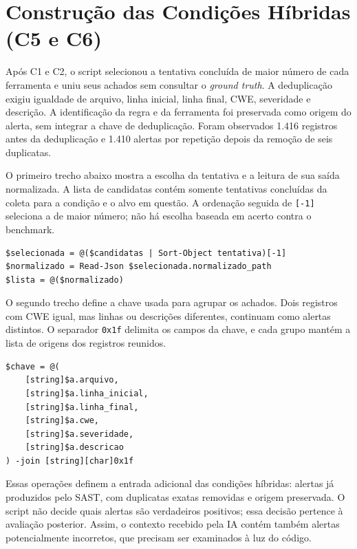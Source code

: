 \section{Construção das Condições Híbridas (C5 e C6)}\label{sec:condicao-hibrida-desenvolvimento}

Após C1 e C2, o script  selecionou a tentativa concluída de maior número de cada ferramenta e uniu seus achados sem consultar o \textit{ground truth}. A deduplicação exigiu igualdade de arquivo, linha inicial, linha final, CWE, severidade e descrição. A identificação da regra e da ferramenta foi preservada como origem do alerta, sem integrar a chave de deduplicação. Foram observados 1.416 registros antes da deduplicação e 1.410 alertas por repetição depois da remoção de seis duplicatas.

O primeiro trecho abaixo mostra a escolha da tentativa e a leitura de sua saída normalizada. A lista de candidatas contém somente tentativas concluídas da coleta para a condição e o alvo em questão. A ordenação seguida de \texttt{[-1]} seleciona a de maior número; não há escolha baseada em acerto contra o benchmark.

\begingroup\footnotesize
\begin{verbatim}
$selecionada = @($candidatas | Sort-Object tentativa)[-1]
$normalizado = Read-Json $selecionada.normalizado_path
$lista = @($normalizado)
\end{verbatim}
\endgroup

O segundo trecho define a chave usada para agrupar os achados. Dois registros com CWE igual, mas linhas ou descrições diferentes, continuam como alertas distintos. O separador \texttt{0x1f} delimita os campos da chave, e cada grupo mantém a lista de origens dos registros reunidos.

\begingroup\footnotesize
\begin{verbatim}
$chave = @(
    [string]$a.arquivo,
    [string]$a.linha_inicial,
    [string]$a.linha_final,
    [string]$a.cwe,
    [string]$a.severidade,
    [string]$a.descricao
) -join [string][char]0x1f
\end{verbatim}
\endgroup

Essas operações definem a entrada adicional das condições híbridas: alertas já produzidos pelo SAST, com duplicatas exatas removidas e origem preservada. O script não decide quais alertas são verdadeiros positivos; essa decisão pertence à avaliação posterior. Assim, o contexto recebido pela IA contém também alertas potencialmente incorretos, que precisam ser examinados à luz do código.

